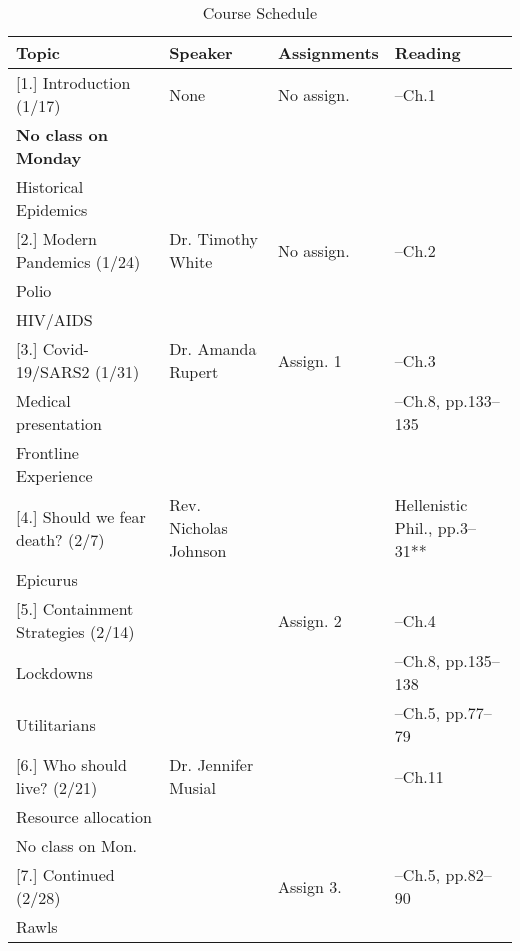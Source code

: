 \documentclass[article,oneside]{memoir}
\begin{document}
\begin{landscape}
\begin{center}
\begin{longtable}{p{6cm}p{4cm}p{6cm}p{4cm}}
 
  \caption{Course Schedule} \\
  \toprule
  \textbf{Topic}   & \textbf{Speaker} & \textbf{Assignments} & \textbf{Reading} \\
  \midrule

  
[1.] Introduction (1/17) 		& None				& No assign.		&  --Ch.1 \\ 
\textbf{No class on Monday}	&					&				&   \\
Historical Epidemics			&					&				& \\
[1.8\baselineskip] \hline


[2.] Modern Pandemics (1/24)	  & Dr. Timothy White 	 &  No assign.	& --Ch.2\\
Polio 					  &	 	&			 &  \\ 
HIV/AIDS					  &	 	& 	 		& \\ [1.8\baselineskip] \hline



[3.] Covid-19/SARS2 (1/31)	& Dr. Amanda Rupert 	& Assign. 1	& --Ch.3   \\ 
Medical presentation			&					& & --Ch.8, pp.133--135  \\ 
Frontline Experience			&					&  & \\[1.8\baselineskip]  \hline 

[4.] Should we fear death? (2/7) & Rev. Nicholas Johnson	 &     	 &  Hellenistic Phil., pp.3–31** \\
Epicurus					 & 					 & 	 &  \\ [1.8\baselineskip]  \hline %


[5.] Containment Strategies (2/14)	& 			& Assign. 2 	&  --Ch.4  \\
Lockdowns			    	    	& 			&			&  --Ch.8, pp.135--138  \\ 
Utilitarians		    	    			& 			&			&  --Ch.5, pp.77--79 \\  [1.8\baselineskip]  \hline 

[6.] Who should live?  (2/21)	   	&  Dr. Jennifer Musial		&      &  --Ch.11 \\
Resource allocation				&						&	&	 \\
No class on Mon.			     	& 						&	&  	 \\ [1.8\baselineskip]  \hline 

[7.] Continued (2/28)				& 			& Assign 3.		&  --Ch.5, pp.82--90 \\
Rawls						& 			&	  			& \\  [1.8\baselineskip]  \hline


\end{longtable}
\end{center}
\end{landscape}
\end{document}
